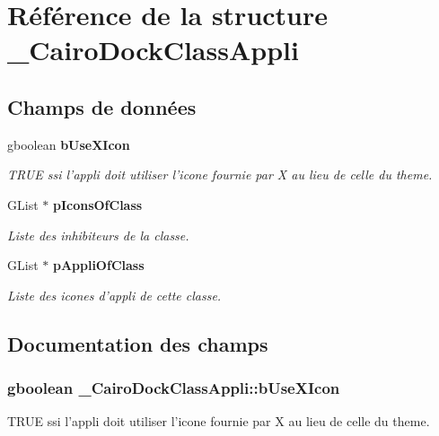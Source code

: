 \section{Référence de la structure \_\-CairoDockClassAppli}
\label{struct__CairoDockClassAppli}
\subsection*{Champs de données}
\begin{CompactItemize}
\item 
gboolean {\bf bUseXIcon}
\begin{CompactList}\small\item\em TRUE ssi l'appli doit utiliser l'icone fournie par X au lieu de celle du theme. \item\end{CompactList}\item 
GList $\ast$ {\bf pIconsOfClass}
\begin{CompactList}\small\item\em Liste des inhibiteurs de la classe. \item\end{CompactList}\item 
GList $\ast$ {\bf pAppliOfClass}
\begin{CompactList}\small\item\em Liste des icones d'appli de cette classe. \item\end{CompactList}\end{CompactItemize}


\subsection{Documentation des champs}
\subsubsection{\setlength{\rightskip}{0pt plus 5cm}gboolean {\bf \_\-CairoDockClassAppli::bUseXIcon}}\label{struct__CairoDockClassAppli_ba663dfcce230d74d0fe49ee447da2dd}


TRUE ssi l'appli doit utiliser l'icone fournie par X au lieu de celle du theme. 

